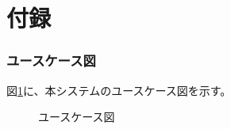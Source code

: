\documentclass[a4j]{jarticle}
\begin{document}
% 
%
%
%
\newpage
\appendix
\part*{付録}

\setcounter{section}{0} %
\renewcommand{\thesection}{\Alph{section}} %
\setcounter{figure}{0} %
\renewcommand{\thefigure}{\Alph{section}}


\section{ユースケース図}
図\ref{UseCase:UseCasetest}に、本システムのユースケース図を示す。
\begin{figure}[H]
\begin{center}
\caption{ユースケース図}
\label{UseCase:UseCasetest}
\end{center}
\end{figure}

\newpage
\setcounter{figure}{0} %
\renewcommand{\thefigure}{\Alph{section}-\arabic{figure}}
\end{document}
